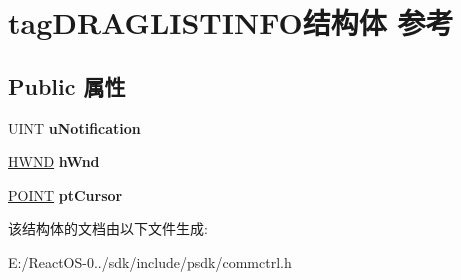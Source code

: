 \hypertarget{structtag_d_r_a_g_l_i_s_t_i_n_f_o}{}\section{tag\+D\+R\+A\+G\+L\+I\+S\+T\+I\+N\+F\+O结构体 参考}
\label{structtag_d_r_a_g_l_i_s_t_i_n_f_o}
\subsection*{Public 属性}
\begin{DoxyCompactItemize}
\item 
\mbox{\label{structtag_d_r_a_g_l_i_s_t_i_n_f_o_a27ec6c84aa05abaf56e989df2fd4003a}} 
U\+I\+NT {\bfseries u\+Notification}
\item 
\mbox{\label{structtag_d_r_a_g_l_i_s_t_i_n_f_o_a6056112a156adf7175dfc5a2d0b053bc}} 
\hyperlink{interfacevoid}{H\+W\+ND} {\bfseries h\+Wnd}
\item 
\mbox{\label{structtag_d_r_a_g_l_i_s_t_i_n_f_o_aac34f316320723f2c8d51a268dba5cee}} 
\hyperlink{structtag_p_o_i_n_t}{P\+O\+I\+NT} {\bfseries pt\+Cursor}
\end{DoxyCompactItemize}


该结构体的文档由以下文件生成\+:\begin{DoxyCompactItemize}
\item 
E\+:/\+React\+O\+S-\/0../sdk/include/psdk/commctrl.\+h\end{DoxyCompactItemize}
